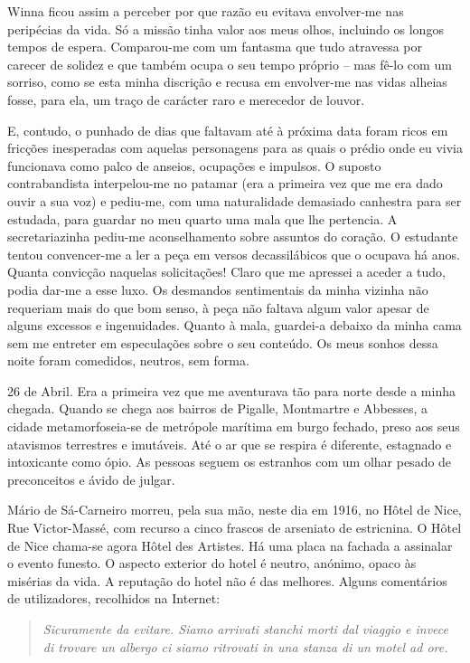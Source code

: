 Winna ficou assim a perceber por que razão eu evitava envolver-me nas
peripécias da vida. Só a missão tinha valor aos meus olhos, incluindo os
longos tempos de espera. Comparou-me com um fantasma que tudo
atravessa por carecer de solidez e que também ocupa o seu tempo próprio
-- mas fê-lo com um sorriso, como se esta minha discrição e recusa em
envolver-me nas vidas alheias fosse, para ela, um traço de carácter raro
e merecedor de louvor.

E, contudo, o punhado de dias que faltavam até à próxima data foram
ricos em fricções inesperadas com aquelas personagens para as quais o
prédio onde eu vivia funcionava como
palco de anseios, ocupações e impulsos. O suposto contrabandista
interpelou-me no patamar (era a primeira vez que me era dado ouvir a sua
voz) e pediu-me, com uma naturalidade demasiado canhestra para ser
estudada, para guardar no meu quarto uma mala que lhe pertencia. A
secretariazinha pediu-me aconselhamento sobre assuntos do coração. O estudante tentou
convencer-me a ler a peça em versos decassilábicos que o ocupava há
anos. Quanta convicção naquelas solicitações! Claro que me apressei a
aceder a tudo, podia dar-me a esse luxo. Os desmandos sentimentais da
minha vizinha não requeriam mais do que bom senso, à peça não faltava
algum valor apesar de alguns excessos e ingenuidades. Quanto à mala,
guardei-a debaixo da minha cama sem me entreter em especulações sobre o
seu conteúdo. Os meus sonhos dessa noite foram comedidos, neutros, sem
forma.

26 de Abril. Era a primeira vez que me aventurava tão para norte desde a
minha chegada. Quando se chega aos bairros de Pigalle, Montmartre e
Abbesses, a cidade metamorfoseia-se de metrópole marítima em burgo
fechado, preso aos seus atavismos terrestres e imutáveis. Até o ar que
se respira é diferente, estagnado e intoxicante como ópio. As pessoas
seguem os estranhos com um olhar pesado de preconceitos e ávido de
julgar.

Mário de Sá-Carneiro morreu, pela sua mão, neste dia em 1916, no Hôtel
de Nice, Rue Victor-Massé, com recurso a cinco frascos de arseniato de
estricnina. O Hôtel de Nice chama-se agora Hôtel des Artistes. Há uma
placa na fachada a assinalar o evento funesto. O aspecto exterior do
hotel é neutro, anónimo, opaco às misérias da vida. A reputação do hotel
não é das melhores. Alguns comentários de utilizadores, recolhidos na
Internet:


\begin{quote}
\emph{Sicuramente da evitare. Siamo arrivati stanchi morti dal viaggio e
invece di trovare un albergo ci siamo ritrovati in una stanza di un
motel ad ore.}
\end{quote}

